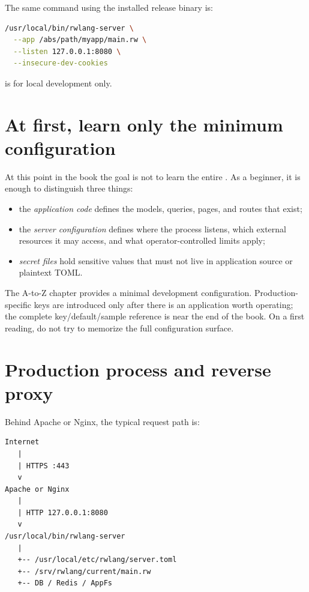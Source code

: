 The same command using the installed release binary is:

\begin{lstlisting}[language=bash]
/usr/local/bin/rwlang-server \
  --app /abs/path/myapp/main.rw \
  --listen 127.0.0.1:8080 \
  --insecure-dev-cookies
\end{lstlisting}

 is for local development only.

\section{At first, learn only the minimum configuration}

At this point in the book the goal is not to learn the entire . As a beginner, it is enough to distinguish three things:

\begin{itemize}
  \item the \emph{application code} defines the models, queries, pages, and routes that exist;
  \item the \emph{server configuration} defines where the process listens, which external resources it may access, and what operator-controlled limits apply;
  \item \emph{secret files} hold sensitive values that must not live in application source or plaintext TOML.
\end{itemize}

The A-to-Z chapter provides a minimal development configuration. Production-specific keys are introduced only after there is an application worth operating; the complete key/default/sample reference is near the end of the book. On a first reading, do not try to memorize the full configuration surface.

\section{Production process and reverse proxy}

Behind Apache or Nginx, the typical request path is:

\begin{lstlisting}
Internet
   |
   | HTTPS :443
   v
Apache or Nginx
   |
   | HTTP 127.0.0.1:8080
   v
/usr/local/bin/rwlang-server
   |
   +-- /usr/local/etc/rwlang/server.toml
   +-- /srv/rwlang/current/main.rw
   +-- DB / Redis / AppFs
\end{lstlisting}

